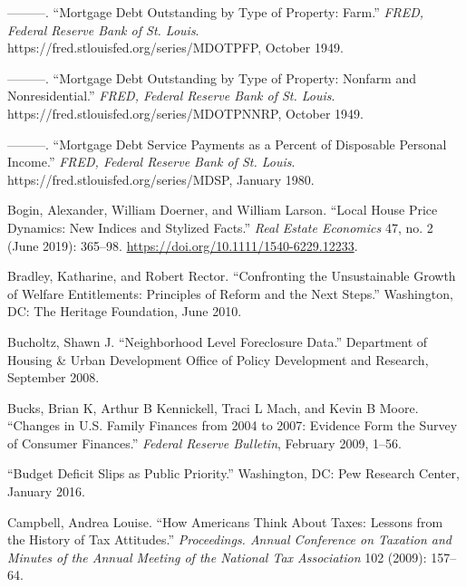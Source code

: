 \documentclass[12pt,oneside]{psthesis}
\begin{document}
\leavevmode\hypertarget{ref-boardofgovernorsofthefederalreservesystemus1949mortgagea}{}%
---------. ``Mortgage Debt Outstanding by Type of Property: Farm.'' \emph{FRED, Federal Reserve Bank of St. Louis}.\\ https://fred.stlouisfed.org/series/MDOTPFP, October 1949.

\leavevmode\hypertarget{ref-boardofgovernorsofthefederalreservesystemus1949mortgageb}{}%
---------. ``Mortgage Debt Outstanding by Type of Property: Nonfarm and Nonresidential.'' \emph{FRED, Federal Reserve Bank of St. Louis}. \\ https://fred.stlouisfed.org/series/MDOTPNNRP, October 1949.

\leavevmode\hypertarget{ref-boardofgovernorsofthefederalreservesystemus1980mortgage}{}%
---------. ``Mortgage Debt Service Payments as a Percent of Disposable Personal Income.'' \emph{FRED, Federal Reserve Bank of St. Louis}. https://fred.stlouisfed.org/series/MDSP, January 1980.

\leavevmode\hypertarget{ref-bogin2019local}{}%
Bogin, Alexander, William Doerner, and William Larson. ``Local House Price Dynamics: New Indices and Stylized Facts.'' \emph{Real Estate Economics} 47, no. 2 (June 2019): 365--98. \url{https://doi.org/10.1111/1540-6229.12233}.

\leavevmode\hypertarget{ref-bradley2010confronting}{}%
Bradley, Katharine, and Robert Rector. ``Confronting the Unsustainable Growth of Welfare Entitlements: Principles of Reform and the Next Steps.'' Washington, DC: The Heritage Foundation, June 2010.

\leavevmode\hypertarget{ref-bucholtz2008neighborhood}{}%
Bucholtz, Shawn J. ``Neighborhood Level Foreclosure Data.'' Department of Housing \& Urban Development Office of Policy Development and Research, September 2008.

\leavevmode\hypertarget{ref-bucks2009changes}{}%
Bucks, Brian K, Arthur B Kennickell, Traci L Mach, and Kevin B Moore. ``Changes in U.S. Family Finances from 2004 to 2007: Evidence Form the Survey of Consumer Finances.'' \emph{Federal Reserve Bulletin}, February 2009, 1--56.

\leavevmode\hypertarget{ref-2016budget}{}%
``Budget Deficit Slips as Public Priority.'' Washington, DC: Pew Research Center, January 2016.

\leavevmode\hypertarget{ref-campbell2009how}{}%
Campbell, Andrea Louise. ``How Americans Think About Taxes: Lessons from the History of Tax Attitudes.'' \emph{Proceedings. Annual Conference on Taxation and Minutes of the Annual Meeting of the National Tax Association} 102 (2009): 157--64.
\end{document}

